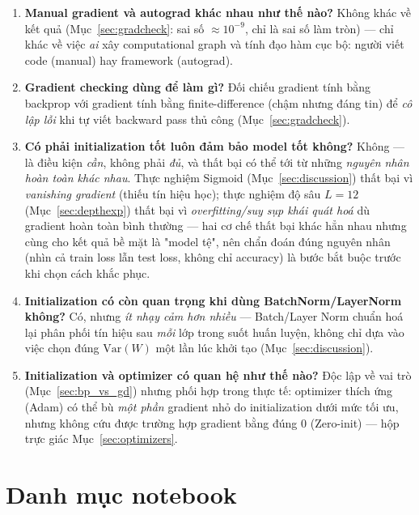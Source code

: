 \documentclass[12pt,a4paper]{article}
\begin{document}
\begin{enumerate}
  cũng là Backpropagation, chỉ tự động hoá việc xây đồ thị thay vì viết
  tay (Mục~\ref{sec:implementation}).
\item \textbf{Manual gradient và autograd khác nhau như thế nào?} Không
  khác về kết quả (Mục~\ref{sec:gradcheck}: sai số $\approx10^{-9}$, chỉ
  là sai số làm tròn) --- chỉ khác về việc \emph{ai} xây computational
  graph và tính đạo hàm cục bộ: người viết code (manual) hay framework
  (autograd).
\item \textbf{Gradient checking dùng để làm gì?} Đối chiếu gradient tính
  bằng backprop với gradient tính bằng finite-difference (chậm nhưng
  đáng tin) để \emph{cô lập lỗi} khi tự viết backward pass thủ công
  (Mục~\ref{sec:gradcheck}).
\item \textbf{Có phải initialization tốt luôn đảm bảo model tốt không?}
  Không --- là điều kiện \emph{cần}, không phải \emph{đủ}, và thất bại có
  thể tới từ những \emph{nguyên nhân hoàn toàn khác nhau}. Thực nghiệm
  Sigmoid (Mục~\ref{sec:discussion}) thất bại vì \emph{vanishing gradient}
  (thiếu tín hiệu học); thực nghiệm độ sâu $L{=}12$
  (Mục~\ref{sec:depthexp}) thất bại vì \emph{overfitting/suy sụp khái
  quát hoá} dù gradient hoàn toàn bình thường --- hai cơ chế thất bại
  khác hẳn nhau nhưng cùng cho kết quả bề mặt là "model tệ", nên chẩn
  đoán đúng nguyên nhân (nhìn cả train loss lẫn test loss, không chỉ
  accuracy) là bước bắt buộc trước khi chọn cách khắc phục.
\item \textbf{Initialization có còn quan trọng khi dùng BatchNorm/LayerNorm
  không?} Có, nhưng \emph{ít nhạy cảm hơn nhiều} --- Batch/Layer Norm
  chuẩn hoá lại phân phối tín hiệu sau \emph{mỗi} lớp trong suốt huấn
  luyện, không chỉ dựa vào việc chọn đúng $\mathrm{Var}(W)$ một lần lúc
  khởi tạo (Mục~\ref{sec:discussion}).
\item \textbf{Initialization và optimizer có quan hệ như thế nào?} Độc
  lập về vai trò (Mục~\ref{sec:bp_vs_gd}) nhưng phối hợp trong thực tế:
  optimizer thích ứng (Adam) có thể bù \emph{một phần} gradient nhỏ do
  initialization dưới mức tối ưu, nhưng không cứu được trường hợp gradient
  bằng đúng $0$ (Zero-init) --- hộp trực giác Mục~\ref{sec:optimizers}.
\end{enumerate}

\section{Danh mục notebook}
\label{app:notebooks}
\end{document}
